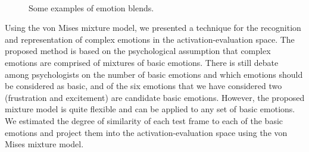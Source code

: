 \documentclass[10pt,journal,cspaper,compsoc]{IEEEtran}
\begin{document}
\begin{figure}[th!]
\centering
		\\
\caption{Some examples of emotion blends.}
\label{fig_waves}
\end{figure}

Using the von Mises mixture model, we presented a technique for the recognition and representation of complex emotions in the activation-evaluation space. The proposed method is based on the psychological assumption that complex emotions are comprised of mixtures of basic emotions. There is still debate among psychologists on the number of basic emotions and which emotions should be considered as basic, and of the six emotions that we have considered two (frustration and excitement) are candidate basic emotions. However, the proposed mixture model is quite flexible and can be applied to any set of basic emotions. We estimated the degree of similarity of each test frame to each of the basic emotions and project them into the activation-evaluation space using the von Mises mixture model.
\end{document}
